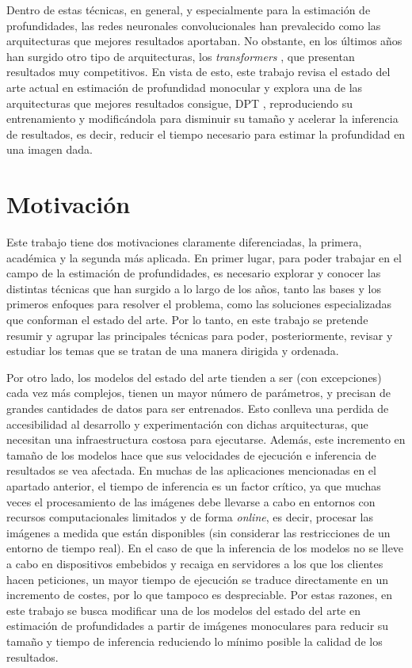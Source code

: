 Dentro de estas técnicas, en general, y especialmente para la estimación de profundidades, las redes neuronales convolucionales han prevalecido como las arquitecturas que mejores resultados aportaban. No obstante, en los últimos años han surgido otro tipo de arquitecturas, los \textit{transformers} \cite{NIPS2017_3f5ee243}, que presentan resultados muy competitivos. En vista de esto, este trabajo revisa el estado del arte actual en estimación de profundidad monocular y explora una de las arquitecturas que mejores resultados consigue, DPT \cite{visiontransformersDPT}, reproduciendo su entrenamiento y modificándola para disminuir su tamaño y acelerar la inferencia de resultados, es decir, reducir el tiempo necesario para estimar la profundidad en una imagen dada. 

\section{Motivación}

Este trabajo tiene dos motivaciones claramente diferenciadas, la primera, académica y la segunda más aplicada. En primer lugar, para poder trabajar en el campo de la estimación de profundidades, es necesario explorar y conocer las distintas técnicas que han surgido a lo largo de los años, tanto las bases y los primeros enfoques para resolver el problema, como las soluciones especializadas que conforman el estado del arte. Por lo tanto, en este trabajo se pretende resumir y agrupar las principales técnicas para poder, posteriormente, revisar y estudiar los temas que se tratan de una manera dirigida y ordenada.

Por otro lado, los modelos del estado del arte tienden a ser (con excepciones) cada vez más complejos, tienen un mayor número de parámetros, y precisan de grandes cantidades de datos para ser entrenados. Esto conlleva una perdida de accesibilidad al desarrollo y experimentación con dichas arquitecturas, que necesitan una infraestructura costosa para ejecutarse. Además, este incremento en tamaño de los modelos hace que sus velocidades de ejecución e inferencia de resultados se vea afectada. En muchas de las aplicaciones mencionadas en el apartado anterior, el tiempo de inferencia es un factor crítico, ya que muchas veces el procesamiento de las imágenes debe llevarse a cabo en entornos con recursos computacionales limitados y de forma \textit{online}, es decir, procesar las imágenes a medida que están disponibles (sin considerar las restricciones de un entorno de tiempo real). En el caso de que la inferencia de los modelos no se lleve a cabo en dispositivos embebidos y recaiga en servidores a los que los clientes hacen peticiones, un mayor tiempo de ejecución se traduce directamente en un incremento de costes, por lo que tampoco es despreciable. Por estas razones, en este trabajo se busca modificar una de los modelos del estado del arte en estimación de profundidades a partir de imágenes monoculares para reducir su tamaño y tiempo de inferencia reduciendo lo mínimo posible la calidad de los resultados.

